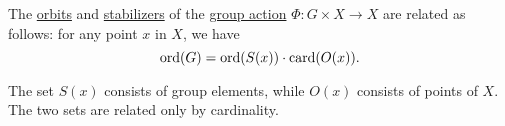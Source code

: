 \begin{theorem}\label{thm:orbit_stabilizer_theorem}
  The \hyperref[def:group_action_orbit]{orbits} and \hyperref[def:group_action_stabilizer]{stabilizers} of the \hyperref[def:group_action]{group action} \( \Phi: G \times X \to X \) are related as follows: for any point \( x \) in \( X \), we have
  \begin{equation}\label{eq:thm:orbit_stabilizer_theorem}
    \operatorname{ord}(G) = \operatorname{ord}(S(x)) \cdot \operatorname{card}(O(x)).
  \end{equation}
\end{theorem}
\begin{comments}
  \item The set \( S(x) \) consists of group elements, while \( O(x) \) consists of points of \( X \).  The two sets are related only by cardinality.
\end{comments}
